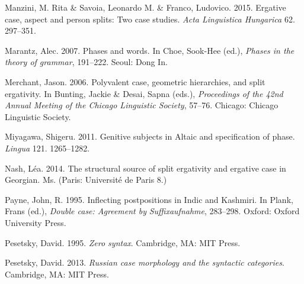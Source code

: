 \documentclass[output=paper]{langsci/langscibook}
\begin{document}
\begin{styleSfondomedioiColorexi}
Manzini, M. Rita \& Savoia, Leonardo M. \& Franco, Ludovico. 2015. Ergative case, aspect and person splits: Two case studies. \textit{Acta Linguistica Hungarica} 62. 297–351.
\end{styleSfondomedioiColorexi}

\begin{styleSfondomedioiColorexxi}
Marantz, Alec. 2007. Phases and words. In Choe, Sook-Hee (ed.), \textit{Phases in the theory of grammar}, 191–222. Seoul: Dong In.
\end{styleSfondomedioiColorexxi}

\begin{styleSfondomedioiColorexxi}
Merchant, Jason. 2006. Polyvalent case, geometric hierarchies, and split ergativity. In Bunting, Jackie \& Desai, Sapna (eds.), \textit{Proceedings of the 42nd Annual Meeting of the Chicago Linguistic Society}, 57–76. Chicago: Chicago Linguistic Society.
\end{styleSfondomedioiColorexxi}

\begin{styleSfondomedioiColorexxi}
Miyagawa, Shigeru. 2011. Genitive subjects in Altaic and specification of phase. \textit{Lingua} 121. 1265–1282.
\end{styleSfondomedioiColorexxi}

\begin{styleSfondomedioiColorexxi}
Nash, Léa. 2014. The structural source of split ergativity and ergative case in Georgian. Ms. (Paris: Université de Paris 8.)
\end{styleSfondomedioiColorexxi}

\begin{styleSfondomedioiColorexxi}
Payne, John, R. 1995. Inflecting postpositions in Indic and Kashmiri. In Plank, Frans (ed.), \textit{Double case: Agreement by} \textit{Suffixaufnahme}, 283–298. Oxford: Oxford University Press. 
\end{styleSfondomedioiColorexxi}

\begin{styleSfondomedioiColorexi}
Pesetsky, David. 1995. \textit{Zero syntax}. Cambridge, MA: MIT Press.
\end{styleSfondomedioiColorexi}

\begin{styleSfondomedioiColorexi}
Pesetsky, David. 2013. \textit{Russian case morphology and the syntactic categories}. Cambridge, MA: MIT Press.
\end{styleSfondomedioiColorexi}
\end{document}
